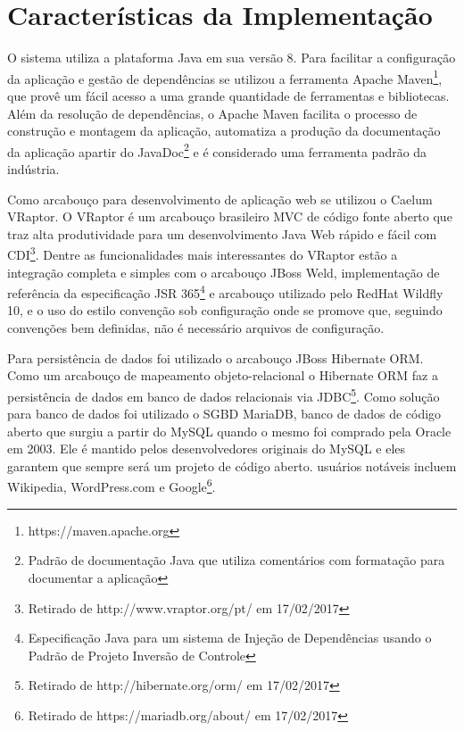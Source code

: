 \section{Características da Implementação} \label{sec:ajudaai:caracteristicas}

O sistema utiliza a plataforma Java em sua versão 8. Para facilitar a configuração da aplicação e gestão de dependências se utilizou a ferramenta Apache Maven\footnote{https://maven.apache.org}, que provê um fácil acesso a uma grande quantidade de ferramentas e bibliotecas. Além da resolução de dependências, o Apache Maven facilita o processo de construção e montagem da aplicação, automatiza a produção da documentação da aplicação apartir do JavaDoc\footnote{Padrão de documentação Java que utiliza comentários com formatação para documentar a aplicação} e é considerado uma ferramenta padrão da indústria.

Como arcabouço para desenvolvimento de aplicação web se utilizou o Caelum VRaptor. O VRaptor é um arcabouço brasileiro MVC de código fonte aberto que traz alta produtividade para um desenvolvimento Java Web rápido e fácil com CDI\footnote{Retirado de http://www.vraptor.org/pt/ em 17/02/2017}. Dentre as funcionalidades mais interessantes do VRaptor estão a integração completa e simples com o arcabouço JBoss Weld, implementação de referência da especificação JSR 365\footnote{Especificação Java para um sistema de Injeção de Dependências usando o Padrão de Projeto Inversão de Controle} e arcabouço utilizado pelo RedHat Wildfly 10, e o uso do estilo convenção sob configuração onde se promove que, seguindo convenções bem definidas, não é necessário arquivos de configuração.

Para persistência de dados foi utilizado o arcabouço JBoss Hibernate ORM. Como um arcabouço de mapeamento objeto-relacional o Hibernate ORM faz a persistência de dados em banco de dados relacionais via JDBC\footnote{Retirado de http://hibernate.org/orm/ em 17/02/2017}. Como solução para banco de dados foi utilizado o SGBD MariaDB, banco de dados de código aberto que surgiu a partir do MySQL quando o mesmo foi comprado pela Oracle em 2003. Ele é mantido pelos desenvolvedores originais do MySQL e eles garantem que sempre será um projeto de código aberto. usuários notáveis incluem Wikipedia, WordPress.com e Google\footnote{Retirado de https://mariadb.org/about/ em 17/02/2017}.

